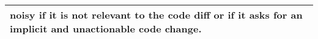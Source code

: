 \begin{table*}[!t]
\begin{tabular}{p{\textwidth}}
noisy if it is not relevant to the code diff or if it asks for an implicit and unactionable code change.\\
        

        
        \bottomrule 
    \end{tabular}
    
\end{table*}

